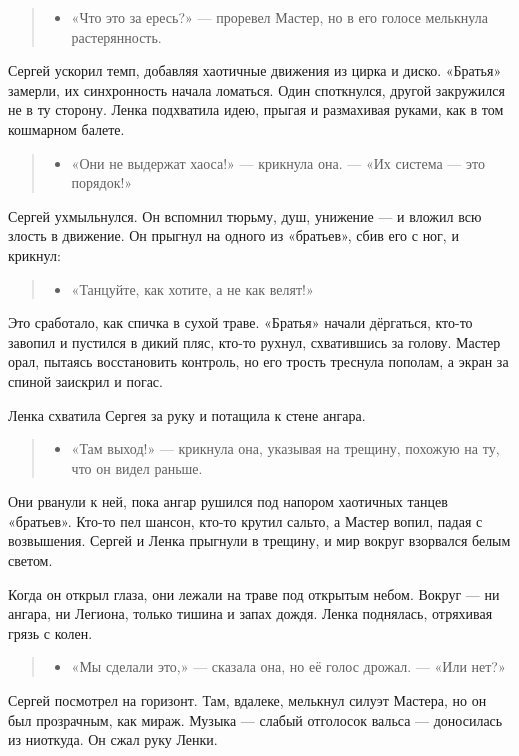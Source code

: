 \documentclass[12pt,a4paper]{book}
\newenvironment{dialogue}{\begin{quote}\itshape\begin{itemize}\item[]}{\end{itemize}\end{quote}}
\begin{document}
\begin{dialogue}
«Что это за ересь?» --- проревел Мастер, но в его голосе мелькнула растерянность.
\end{dialogue}

Сергей ускорил темп, добавляя хаотичные движения из цирка и диско. «Братья» замерли, их синхронность начала ломаться. Один споткнулся, другой закружился не в ту сторону. Ленка подхватила идею, прыгая и размахивая руками, как в том кошмарном балете.

\begin{dialogue}
«Они не выдержат хаоса!» --- крикнула она. --- «Их система — это порядок!»
\end{dialogue}

Сергей ухмыльнулся. Он вспомнил тюрьму, душ, унижение --- и вложил всю злость в движение. Он прыгнул на одного из «братьев», сбив его с ног, и крикнул:

\begin{dialogue}
«Танцуйте, как хотите, а не как велят!»
\end{dialogue}

Это сработало, как спичка в сухой траве. «Братья» начали дёргаться, кто-то завопил и пустился в дикий пляс, кто-то рухнул, схватившись за голову. Мастер орал, пытаясь восстановить контроль, но его трость треснула пополам, а экран за спиной заискрил и погас.

Ленка схватила Сергея за руку и потащила к стене ангара.

\begin{dialogue}
«Там выход!» --- крикнула она, указывая на трещину, похожую на ту, что он видел раньше.
\end{dialogue}

Они рванули к ней, пока ангар рушился под напором хаотичных танцев «братьев». Кто-то пел шансон, кто-то крутил сальто, а Мастер вопил, падая с возвышения. Сергей и Ленка прыгнули в трещину, и мир вокруг взорвался белым светом.

Когда он открыл глаза, они лежали на траве под открытым небом. Вокруг --- ни ангара, ни Легиона, только тишина и запах дождя. Ленка поднялась, отряхивая грязь с колен.

\begin{dialogue}
«Мы сделали это,» --- сказала она, но её голос дрожал. --- «Или нет?»
\end{dialogue}

Сергей посмотрел на горизонт. Там, вдалеке, мелькнул силуэт Мастера, но он был прозрачным, как мираж. Музыка --- слабый отголосок вальса --- доносилась из ниоткуда. Он сжал руку Ленки.
\end{document}
